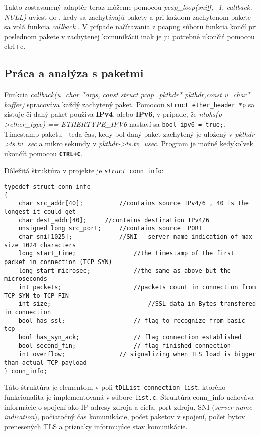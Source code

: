 \documentclass[11pt, a4paper]{article}
\begin{document}
	Takto zostavanený adaptér teraz môžeme pomocou \emph{pcap\_loop(sniff,  -1, callback, NULL)} uviesť do , kedy sa zachytávajú pakety a pri každom zachytenom pakete sa volá funkcia \emph{callback} \cite{Geeksniffer}. V prípade načítavania z pcapng súboru funkcia končí pri poslednom pakete v zachytenej komunikácii inak je ju potrebné ukončiť pomocou ctrl+c.
	
	\subsection{Práca a analýza s paketmi} 
	
	Funkcia \emph{callback(u\_char *args, const struct pcap\_pkthdr* pkthdr,const u\_char* buffer)} spracováva každý zachytený paket. Pomocou \texttt{struct ether\_header *p} sa zisťuje či daný paket používa \textbf{IPv4}, alebo \textbf{IPv6}, v prípade, že \emph{ntohs(p->ether\_type) == ETHERTYPE\_IPV6} nastaví sa \texttt{bool ipv6 = true;}. Timestamp paketu - teda čas, kedy bol daný paket zachytený je uložený v \emph{pkthdr->ts.tv\_sec} a mikro sekundy v \emph{pkthdr->ts.tv\_usec}. Program je možné kedykoľvek ukončíť pomocou \texttt{\textbf{CTRL+C}}. 
	
	Dôležitá štruktúra v projekte je \texttt{\emph{struct} conn\_info}:
	\begin{lstlisting}
typedef struct conn_info
{
    char src_addr[40];			//contains source IPv4/6 , 40 is the longest it could get 
    char dest_addr[40];		//contains destination IPv4/6  
    unsigned long src_port;		//contains source  PORT
    char sni[1025];        		//SNI - server name indication of max size 1024 characters
    long start_time;        		//the timestamp of the first packet in connection (TCP SYN)
    long start_microsec;    		//the same as above but the microseconds
    int packets;            		//packets count in connection from TCP SYN to TCP FIN
    int size;               			//SSL data in Bytes transfered in connection
    bool has_ssl;           		// flag to recognize from basic tcp
    bool has_syn_ack;       		// flag connection established
    bool second_fin;        		// flag finished connection
    int overflow;				// signalizing when TLS load is bigger than actual TCP payload
} conn_info;
	\end{lstlisting}
	
Táto štruktúra je elementom v poli \texttt{tDLList connection\_list}, ktorého funkcionalita je implementovaná v súbore \texttt{list.c}. Štruktúra conn\_info uchováva informácie o spojení ako IP adresy zdroja a cieľa, port zdroju, SNI (\emph{server name indication}), počiatočný čas komunikácie, počet paketov v spojení, počet bytov prenesených TLS a príznaky informujúce stav komunikácie.
\end{document}
